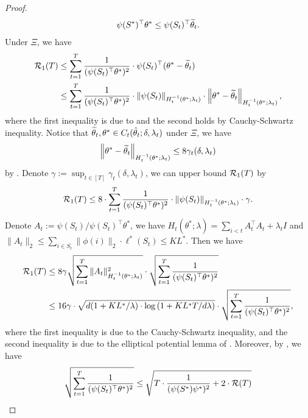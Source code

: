 \begin{theorem}
\begin{proof}
\begin{align}
\label{eq:optimism}
    \psi(S^*)^\top \theta^* \le \psi(S_t)^\top \widetilde{\theta}_t.
\end{align}
Under $\Xi$, we have
\begin{align*}
    {\mathcal{R}}_1(T) &\le \sum_{t=1}^T \frac{1}{(\psi(S_t)^\top \theta^*)^2} \cdot \psi(S_t)^\top (\theta^* - \widetilde{\theta}_t) \\
    &\le \sum_{t=1}^T \frac{1}{(\psi(S_t)^\top \theta^*)^2} \cdot \| \psi(S_t) \|_{H_t^{-1}(\theta^*; \lambda_t)} \cdot \left\|\theta^* - \widetilde{\theta}_t\right\|_{H_t^{-1}(\theta^*; \lambda_t)},
\end{align*}
where the first inequality is due to  and the second holds by Cauchy-Schwartz inequality. Notice that $\widetilde{\theta}_t, \theta^* \in C_t(\hat\theta_t; \delta, \lambda_t)$ under $\Xi$, we have
\begin{align*}
    \left\|\theta^* - \widetilde{\theta}_t\right\|_{H_t^{-1}(\theta^*; \lambda_t)} \le 8\gamma_t(\delta, \lambda_t)
\end{align*}
by \citet[Lemma 30]{liu2024almost}. Denote $\gamma := \sup_{t \in [T]} \gamma_t(\delta, \lambda_t)$, we can upper bound ${\mathcal{R}}_1(T)$ by
\begin{align*}
    {\mathcal{R}}_1(T) \le 8 \cdot \sum_{t=1}^T \frac{1}{(\psi(S_t)^\top \theta^*)^2} \cdot \| \psi(S_t) \|_{H_t^{-1}(\theta^*; \lambda_t)} \cdot \gamma.
\end{align*}
Denote $A_t := \psi(S_t)/\psi(S_t)^\top \theta^*$, we have $H_t(\theta^*; \lambda) = \sum_{i < t} A_t^\top A_t + \lambda_t I$ and $\|A_t\|_2 \le \sum_{i \in S_t} \|\phi(i)\|_2 \cdot \ell^*(S_t) \le KL^*$. Then we have
\begin{align*}
    {\mathcal{R}}_1(T) &\le 8\gamma \sqrt{\sum_{t=1}^T \|A_t\|^2_{H_t^{-1}(\theta^*; \lambda_t)}} \cdot \sqrt{\sum_{t=1}^T \frac{1}{(\psi(S_t)^\top \theta^*)^2}} \\
    &\le 16\gamma \cdot \sqrt{d(1 + KL^*/\lambda) \cdot \log\left(1 + KL^*T/d\lambda\right)} \cdot \sqrt{\sum_{t=1}^T \frac{1}{(\psi(S_t)^\top \theta^*)^2}},
\end{align*}
where the first inequality is due to the Cauchy-Schwartz inequality, and the second inequality is due to the elliptical potential lemma of \citet{abbasi2011improved}. Moreover, by \citet[Lemma 31]{liu2024almost}, we have
\begin{align*}
    \sqrt{\sum_{t=1}^T \frac{1}{(\psi(S_t)^\top \theta^*)^2}} &\le \sqrt{T\cdot \frac{1}{(\psi(S^*)\psi^*)^2} + 2 \cdot \gR(T)} \\

\end{align*}
\end{proof}
\end{theorem}
